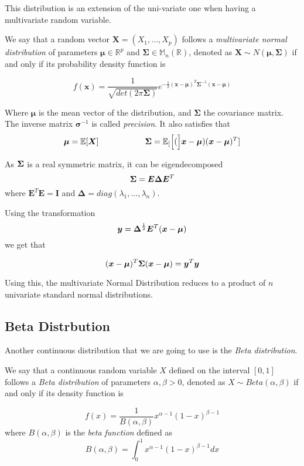 This distribution is an extension of the uni-variate one when having a
multivariate random variable.

\begin{definition}
We say that a random vector \(\bm{X} = (X_1,\dots,X_p)\) follows a \emph{multivariate normal
  distribution} of parameters \(\bm{\mu} \in \mathbb{R}^p\) and \(\bm{\Sigma}
\in \mathbb{M}_n(\mathbb{R})\), denoted as \(\bm{X} \sim N(\bm{\mu},
\bm{\Sigma})\) if and only if its probability density function is

\[
  f(\bm{x}) = \frac{1}{\sqrt{det(2\pi \bm{\Sigma})}}e^{-\frac{1}{2}(\bm{x} - \bm{\mu})^T\bm{\Sigma}^{-1}(\bm{x}-\bm{\mu})}
\]

Where \(\bm{\mu}\) is the mean vector of the distribution, and \(\bm{\Sigma}\)
the covariance matrix. The inverse matrix \(\bm{\sigma}^{-1}\) is called \emph{precision}.
It also satisfies that
\[
\bm{\mu} = \mathbb{E}[\bm{X}] \hspace{2cm} \bm{\Sigma} = \mathbb{E}_{[}\Big[(\Big]\bm{x} - \bm{\mu})(\bm{x} - \bm{\mu})^T]
\]

As \(\bm{\Sigma}\) is a real symmetric matrix, it can be eigendecomposed
\[
  \bm{\Sigma} = \bm{E}\bm{\Delta}\bm{E}^T
\]
where \(\bm{E}^T\bm{E} = \bm{I}\) and \(\bm{\Delta} =
diag(\lambda_1,\dots,\lambda_n)\).

Using the transformation
\[
  \bm{y} = \bm{\Delta}^{\frac{1}{2}}\bm{E}^T(\bm{x} - \bm{\mu})
\]
we get that

\[
  (\bm{x} - \bm{\mu})^T\bm{\Sigma}(\bm{x} - \bm{\mu}) = \bm{y}^T\bm{y}
\]

Using this, the multivariate Normal Distribution reduces to a product of \(n\)
univariate standard normal distributions.


\end{definition}

\subsection{Beta Distrbution}

Another continuous distribution that we are going to use is the \emph{Beta
  distribution}.

\begin{definition}
We say that a continuous random variable \(X\) defined on the
interval \([0,1]\) follows a \emph{Beta distribution} of parameters \(\alpha,
\beta > 0\), denoted as \(X \sim Beta(\alpha, \beta)\) if and only if its
density function is

\[
  f(x) = \frac{1}{B(\alpha, \beta)}x^{\alpha - 1}(1-x)^{\beta -1}
\]
where \(B(\alpha, \beta)\) is the \emph{beta function} defined as
\[
  B(\alpha, \beta) = \int_0^1 x^{\alpha - 1}(1-x)^{\beta -1} dx
\]
\end{definition}

